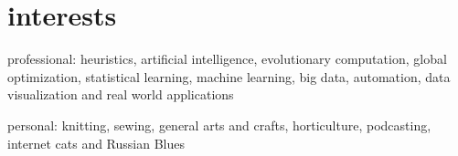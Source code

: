\section{interests}
{\boldfont professional:} heuristics, artificial intelligence, evolutionary 
computation, global optimization, statistical learning, machine learning, big data, automation, data visualization and real world applications 

{\boldfont personal:} knitting, sewing, general arts and crafts, horticulture,  podcasting, internet cats and Russian Blues
